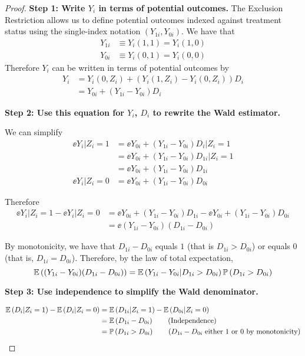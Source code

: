 \documentclass[11pt]{article}
\begin{document}
\begin{proof}

\textbf{Step 1: Write $Y_i$ in terms of potential outcomes.} The Exclusion Restriction allows us to define potential outcomes indexed against treatment status using the single-index notation $(Y_{1i}, Y_{0i})$. We have that
\begin{align*}
	Y_{1i} &\equiv Y_i (1,1) = Y_i(1,0) \\
	Y_{0i} &\equiv Y_i (0,1) = Y_i(0,0)
\end{align*}
Therefore $Y_i$ can be written in terms of potential outcomes by
\begin{align*}
	Y_i &= Y_i(0, Z_i) + (Y_i(1,Z_i) - Y_i(0,Z_i))D_i \\
	&= Y_{0i} + (Y_{1i} - Y_{0i}) D_i
\end{align*}

\textbf{Step 2: Use this equation for $Y_i$, $D_i$ to rewrite the Wald estimator.}

We can simplify
\begin{align*}
	\ee{Y_i | Z_i = 1} &= \ee{Y_{0i} + (Y_{1i} - Y_{0i})D_i | Z_i = 1} \tag{Exclusion Restriction} \\
	&= \ee{Y_{0i} + (Y_{1i} - Y_{0i})D_{1i} | Z_i = 1} \\
	&= \ee{Y_{0i} + (Y_{1i} - Y_{0i})D_{1i}} \tag{Independence} \\
	\ee{Y_i | Z_i = 0} &= \ee{Y_{0i} + (Y_{1i} - Y_{0i})D_{0i}}
\end{align*}

Therefore
\begin{align*}
	\ee{Y_i | Z_i = 1} - \ee{Y_i | Z_i = 0} &= \ee{Y_{0i} + (Y_{1i} - Y_{0i})D_{1i}} - \ee{Y_{0i} + (Y_{1i} - Y_{0i})D_{0i}} \\
	&= \ee{(Y_{1i} - Y_{0i})(D_{1i} - D_{0i})}
\end{align*}

By monotonicity, we have that $D_{1i} - D_{0i}$ equals $1$ (that is $D_{1i} > D_{0i}$) or equals 0 (that is, $D_{1i} = D_{0i}$). Therefore, by the law of total expectation,
\begin{equation}
	\mathop{{}\mathbb{E}}\left( (Y_{1i} - Y_{0i})(D_{1i} - D_{0i}) \right) = \mathop{{}\mathbb{E}}\left( Y_{1i} - Y_{0i} | D_{1i} > D_{0i} \right) \mathop{{}\mathbb{P}}\left( D_{1i} > D_{0i} \right) 	
\end{equation} 

\textbf{Step 3: Use independence to simplify the Wald denominator.}

\begin{align*}
	\ee{D_i | Z_i = 1} - \ee{D_i | Z_i = 0} 
	&= \ee{D_{1i} | Z_{i} = 1} - \ee{D_{0i} | Z_i = 0} \\
	&= \ee{D_{1i} - D_{0i}} \tag{Independence} \\
	&= \pp{D_{1i} > D_{0i}} \tag{$D_{1i} - D_{0i}$ either 1 or 0 by monotonicity}
\end{align*}


\end{proof}
\end{document}
